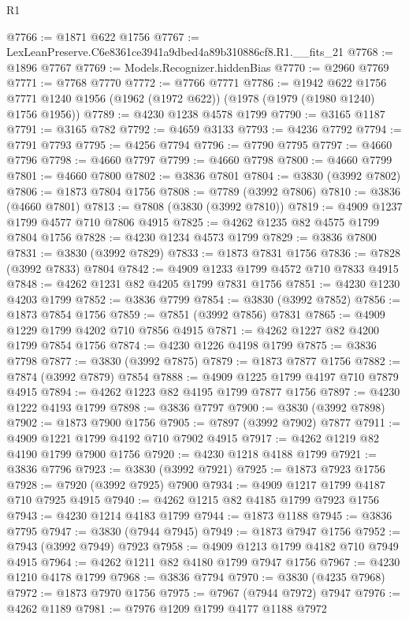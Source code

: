 \begin{lexlean}{R1}
\begin{coremodule}
@7766 := @1871 @622 @1756
@7767 := LexLeanPreserve.C6e8361ce3941a9dbed4a89b310886cf8.R1.__fits_21
@7768 := @1896 @7767
@7769 := Models.Recognizer.hiddenBias
@7770 := @2960 @7769
@7771 := @7768 @7770
@7772 := @7766 @7771
@7786 := @1942
    @622
    @1756
    @7771
    @1240
    @1956
    (@1962 (@1972 @622))
    (@1978 (@1979 (@1980 @1240) @1756 @1956))
@7789 := @4230 @1238 @4578 @1799
@7790 := @3165 @1187
@7791 := @3165 @782
@7792 := @4659 @3133
@7793 := @4236 @7792
@7794 := @7791 @7793
@7795 := @4256 @7794
@7796 := @7790 @7795
@7797 := @4660 @7796
@7798 := @4660 @7797
@7799 := @4660 @7798
@7800 := @4660 @7799
@7801 := @4660 @7800
@7802 := @3836 @7801
@7804 := @3830 (@3992 @7802)
@7806 := @1873 @7804 @1756
@7808 := @7789 (@3992 @7806)
@7810 := @3836 (@4660 @7801)
@7813 := @7808 (@3830 (@3992 @7810))
@7819 := @4909 @1237 @1799 @4577 @710 @7806 @4915
@7825 := @4262 @1235 @82 @4575 @1799 @7804 @1756
@7828 := @4230 @1234 @4573 @1799
@7829 := @3836 @7800
@7831 := @3830 (@3992 @7829)
@7833 := @1873 @7831 @1756
@7836 := @7828 (@3992 @7833) @7804
@7842 := @4909 @1233 @1799 @4572 @710 @7833 @4915
@7848 := @4262 @1231 @82 @4205 @1799 @7831 @1756
@7851 := @4230 @1230 @4203 @1799
@7852 := @3836 @7799
@7854 := @3830 (@3992 @7852)
@7856 := @1873 @7854 @1756
@7859 := @7851 (@3992 @7856) @7831
@7865 := @4909 @1229 @1799 @4202 @710 @7856 @4915
@7871 := @4262 @1227 @82 @4200 @1799 @7854 @1756
@7874 := @4230 @1226 @4198 @1799
@7875 := @3836 @7798
@7877 := @3830 (@3992 @7875)
@7879 := @1873 @7877 @1756
@7882 := @7874 (@3992 @7879) @7854
@7888 := @4909 @1225 @1799 @4197 @710 @7879 @4915
@7894 := @4262 @1223 @82 @4195 @1799 @7877 @1756
@7897 := @4230 @1222 @4193 @1799
@7898 := @3836 @7797
@7900 := @3830 (@3992 @7898)
@7902 := @1873 @7900 @1756
@7905 := @7897 (@3992 @7902) @7877
@7911 := @4909 @1221 @1799 @4192 @710 @7902 @4915
@7917 := @4262 @1219 @82 @4190 @1799 @7900 @1756
@7920 := @4230 @1218 @4188 @1799
@7921 := @3836 @7796
@7923 := @3830 (@3992 @7921)
@7925 := @1873 @7923 @1756
@7928 := @7920 (@3992 @7925) @7900
@7934 := @4909 @1217 @1799 @4187 @710 @7925 @4915
@7940 := @4262 @1215 @82 @4185 @1799 @7923 @1756
@7943 := @4230 @1214 @4183 @1799
@7944 := @1873 @1188
@7945 := @3836 @7795
@7947 := @3830 (@7944 @7945)
@7949 := @1873 @7947 @1756
@7952 := @7943 (@3992 @7949) @7923
@7958 := @4909 @1213 @1799 @4182 @710 @7949 @4915
@7964 := @4262 @1211 @82 @4180 @1799 @7947 @1756
@7967 := @4230 @1210 @4178 @1799
@7968 := @3836 @7794
@7970 := @3830 (@4235 @7968)
@7972 := @1873 @7970 @1756
@7975 := @7967 (@7944 @7972) @7947
@7976 := @4262 @1189
@7981 := @7976 @1209 @1799 @4177 @1188 @7972

\end{coremodule}
\end{lexlean}

